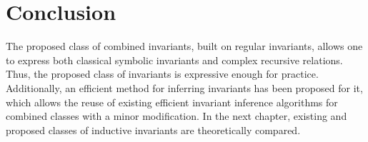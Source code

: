 \section{Conclusion}
The proposed class of combined invariants, built on regular invariants, allows one to express both classical symbolic invariants and complex recursive relations.
Thus, the proposed class of invariants is expressive enough for practice.
Additionally, an efficient method for inferring invariants has been proposed for it, which allows the reuse of existing efficient invariant inference algorithms for combined classes with a minor modification.
In the next chapter, existing and proposed classes of inductive invariants are theoretically compared.

